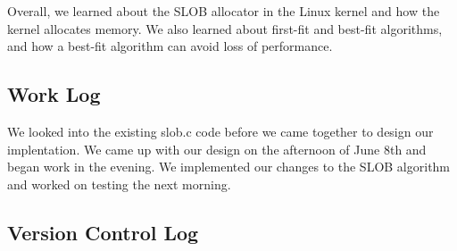 \documentclass[journal, letterpaper, draftclsnofoot, onecolumn, 10pt]{IEEEtran}
\begin{document}
Overall, we learned about the SLOB allocator in the Linux kernel and how the kernel allocates memory.
We also learned about first-fit and best-fit algorithms, and how a best-fit algorithm can avoid loss of performance. \\


\subsection{Work Log}
We looked into the existing slob.c code before we came together to design our implentation.
We came up with our design on the afternoon of June 8th and began work in the evening. We implemented our changes to the SLOB algorithm and worked on testing the next morning.


\clearpage
\subsection{Version Control Log}



\FloatBarrier



\scalebox{0.8}{
}


\FloatBarrier
\end{document}
